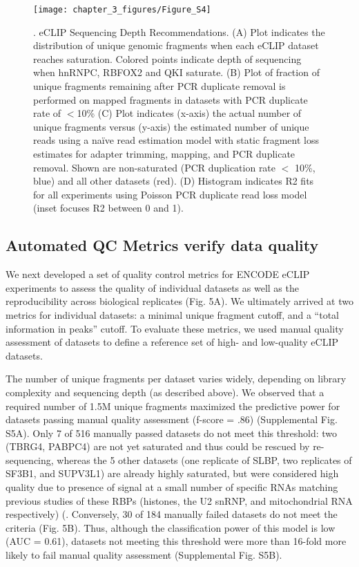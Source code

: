 \begin{figure}[ht]
  \centering
  \texttt{[image: chapter\_3\_figures/Figure\_S4]}
  \caption[Supplementary Figure 4]{. eCLIP Sequencing Depth Recommendations. (A) Plot indicates the distribution of unique genomic fragments when each eCLIP dataset reaches saturation. Colored points indicate depth of sequencing when hnRNPC, RBFOX2 and QKI saturate. (B) Plot of fraction of unique fragments remaining after PCR duplicate removal is performed on mapped fragments in datasets with PCR duplicate rate of $<$10\% (C) Plot indicates (x-axis) the actual number of unique fragments versus (y-axis) the estimated number of unique reads using a naïve read estimation model with static fragment loss estimates for adapter trimming, mapping, and PCR duplicate removal. Shown are non-saturated (PCR duplication rate $<$ 10\%, blue) and all other datasets (red). (D) Histogram indicates R2 fits for all experiments using Poisson PCR duplicate read loss model (inset focuses R2 between 0 and 1). }
  \label{fig:Figure_S4}
\end{figure}

\subsection{Automated QC Metrics verify data quality}
We next developed a set of quality control metrics for ENCODE eCLIP experiments to assess the quality of individual datasets as well as the reproducibility across biological replicates (Fig. 5A). We ultimately arrived at two metrics for individual datasets: a minimal unique fragment cutoff, and a “total information in peaks” cutoff. To evaluate these metrics, we used manual quality assessment of datasets to define a reference set of high- and low-quality eCLIP datasets.

The number of unique fragments per dataset varies widely, depending on library complexity and sequencing depth (as described above). We observed that a required number of 1.5M unique fragments maximized the predictive power for datasets passing manual quality assessment (f-score = .86) (Supplemental Fig. S5A). Only 7 of 516 manually passed datasets do not meet this threshold: two (TBRG4, PABPC4) are not yet saturated and thus could be rescued by re-sequencing, whereas the 5 other datasets (one replicate of SLBP, two replicates of SF3B1, and SUPV3L1) are already highly saturated, but were considered high quality due to presence of signal at a small number of specific RNAs matching previous studies of these RBPs (histones, the U2 snRNP, and mitochondrial RNA respectively) (\cite{Townley-Tilson2006,Hodges1994,Borowski2013}. Conversely, 30 of 184 manually failed datasets do not meet the criteria (Fig. 5B). Thus, although the classification power of this model is low (AUC = 0.61), datasets not meeting this threshold were more than 16-fold more likely to fail manual quality assessment (Supplemental Fig. S5B).

